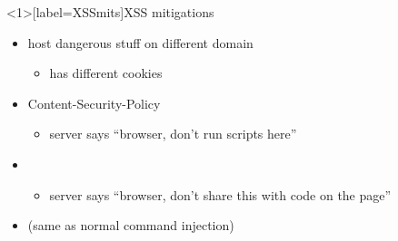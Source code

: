 \begin{frame}<1>[label=XSSmits]{XSS mitigations}
    \begin{itemize}
    \item host dangerous stuff on different domain
        \begin{itemize}
        \item has different cookies
        \end{itemize}
    \item Content-Security-Policy
        \begin{itemize}
        \item server says ``browser, don't run scripts here''
        \end{itemize}
    \item {}
        \begin{itemize}
        \item server says ``browser, don't share this with code on the page''
        \end{itemize}
    \item {} (same as normal command injection)
    \end{itemize}
\end{frame}

